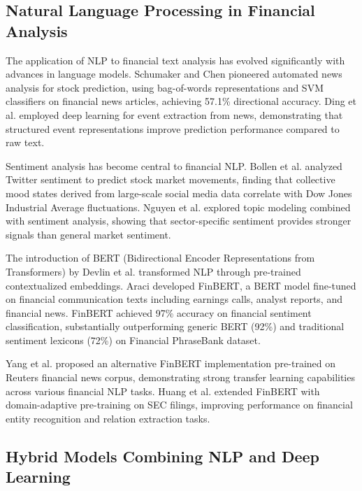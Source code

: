 \documentclass[conference]{IEEEtran}
\begin{document}
\subsection{Natural Language Processing in Financial Analysis}

The application of NLP to financial text analysis has evolved significantly with advances in language models. Schumaker and Chen \cite{schumaker2009textual} pioneered automated news analysis for stock prediction, using bag-of-words representations and SVM classifiers on financial news articles, achieving 57.1\% directional accuracy. Ding et al. \cite{ding2015deep} employed deep learning for event extraction from news, demonstrating that structured event representations improve prediction performance compared to raw text.

Sentiment analysis has become central to financial NLP. Bollen et al. \cite{bollen2011twitter} analyzed Twitter sentiment to predict stock market movements, finding that collective mood states derived from large-scale social media data correlate with Dow Jones Industrial Average fluctuations. Nguyen et al. \cite{nguyen2015sentiment} explored topic modeling combined with sentiment analysis, showing that sector-specific sentiment provides stronger signals than general market sentiment.

The introduction of BERT (Bidirectional Encoder Representations from Transformers) by Devlin et al. \cite{devlin2018bert} transformed NLP through pre-trained contextualized embeddings. Araci \cite{araci2019finbert} developed FinBERT, a BERT model fine-tuned on financial communication texts including earnings calls, analyst reports, and financial news. FinBERT achieved 97\% accuracy on financial sentiment classification, substantially outperforming generic BERT (92\%) and traditional sentiment lexicons (72\%) on Financial PhraseBank dataset.

Yang et al. \cite{yang2020finbert} proposed an alternative FinBERT implementation pre-trained on Reuters financial news corpus, demonstrating strong transfer learning capabilities across various financial NLP tasks. Huang et al. \cite{huang2020finbert} extended FinBERT with domain-adaptive pre-training on SEC filings, improving performance on financial entity recognition and relation extraction tasks.

\subsection{Hybrid Models Combining NLP and Deep Learning}
\end{document}
